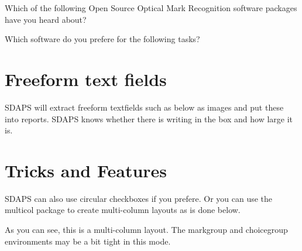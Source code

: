 \documentclass[
  english,
  pagemark,
  stamp]{sdaps}
\begin{document}
\begin{questionnaire}
\begin{choicequestion}[3]{Which of the following Open Source
                              Optical Mark Recognition software
                              packages have you heard about?}
    \end{choicequestion}

    \begin{choicegroup}{Which software do you prefere for the following tasks?}
      \groupaddchoice{\LaTeX}

    \end{choicegroup}

    \section{Freeform text fields}

    SDAPS will extract freeform textfields such as below as images and put
    these into reports. SDAPS knows whether there is writing in the box and
    how large it is.


    \newpage
    \section{Tricks and Features}
    SDAPS can also use circular checkboxes if you prefere. Or you can use the
    {\ttfamily multicol} package to create multi-column layouts as is done below.

    \def\checkboxstyle{ellipse}

    \begin{multicols}{2}
      \label{somelabel}

      As you can see, this is a multi-column layout. The {\ttfamily markgroup} and
      {\ttfamily choicegroup} environments may be a bit tight in this mode.


\end{multicols}
\end{questionnaire}
\end{document}
